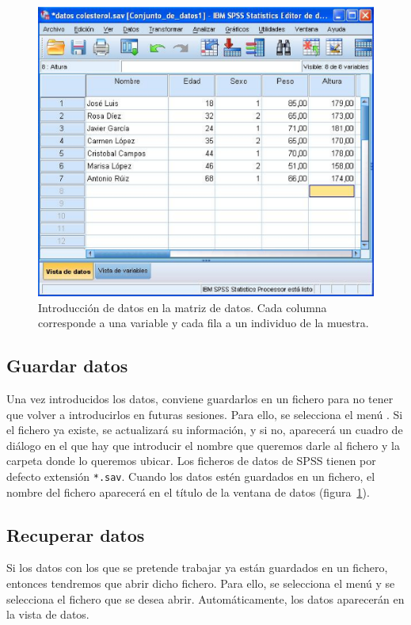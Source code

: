 \begin{figure}[h!]
\begin{center}
\includegraphics[scale=0.5]{introduccion_spss/img/matriz_datos}
\caption{Introducción de datos en la matriz de datos. Cada columna corresponde a una variable y cada fila a un individuo de la muestra.}
\label{g:matriz_datos}
\end{center}
\end{figure}

\subsection{Guardar datos}\label{s:guardar_datos}
Una vez introducidos los datos, conviene guardarlos en un fichero para no tener que volver a introducirlos en futuras sesiones. Para ello,
se selecciona el menú . Si el fichero ya existe, se actualizará su información, y si no, aparecerá un cuadro de
diálogo en el que hay que introducir el nombre que queremos darle al fichero y la carpeta donde lo queremos ubicar. Los ficheros de datos de
SPSS tienen por defecto extensión \texttt{*.sav}. Cuando los datos estén guardados en un fichero, el nombre del fichero aparecerá en el
título de la ventana de datos (figura~\ref{g:matriz_datos}).

\subsection{Recuperar datos}
Si los datos con los que se pretende trabajar ya están guardados en un fichero, entonces tendremos que abrir dicho fichero. Para ello, se
selecciona el menú  y se selecciona el fichero que se desea abrir. Automáticamente, los datos aparecerán
en la vista de datos.

